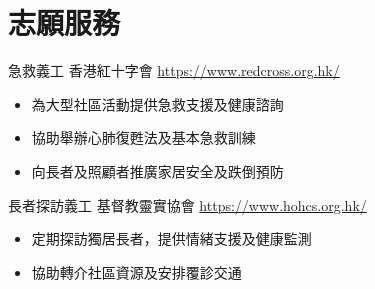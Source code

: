 \documentclass[a4paper, serif, 10pt]{moderncv}
\begin{document}
\section{志願服務}

        {急救義工}
        {香港紅十字會}
        {\url{https://www.redcross.org.hk/}}
        {}
        {\begin{itemize}
\item 為大型社區活動提供急救支援及健康諮詢
\item 協助舉辦心肺復甦法及基本急救訓練
\item 向長者及照顧者推廣家居安全及跌倒預防
\end{itemize}}
    

        {長者探訪義工}
        {基督教靈實協會}
        {\url{https://www.hohcs.org.hk/}}
        {}
        {\begin{itemize}
\item 定期探訪獨居長者，提供情緒支援及健康監測
\item 協助轉介社區資源及安排覆診交通
\end{itemize}}
    
\end{document}
